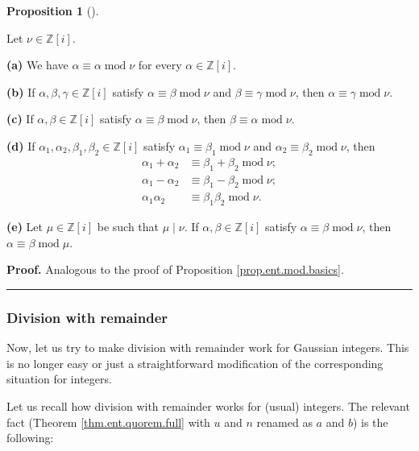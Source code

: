 \documentclass[numbers=enddot,12pt,final,onecolumn,notitlepage]{scrartcl}%
\numberwithin{exer}{subsection}
\theoremstyle{definition}
\newtheorem{prop}[theo]{Proposition}
\newenvironment{proposition}[1][]
{\begin{prop}[#1]\begin{leftbar}}
{\end{leftbar}\end{prop}}
\newenvironment{proof}[1][Proof]{\noindent\textbf{#1.} }{\ \rule{0.5em}{0.5em}}
\begin{document}
\begin{proposition}
\label{prop.Z[i].mod.basics}Let $\nu\in\mathbb{Z}\left[  i\right]  $.

\textbf{(a)} We have $\alpha\equiv\alpha\operatorname{mod}\nu$ for every
$\alpha\in\mathbb{Z}\left[  i\right]  $.

\textbf{(b)} If $\alpha,\beta,\gamma\in\mathbb{Z}\left[  i\right]  $ satisfy
$\alpha\equiv\beta\operatorname{mod}\nu$ and $\beta\equiv\gamma
\operatorname{mod}\nu$, then $\alpha\equiv\gamma\operatorname{mod}\nu$.

\textbf{(c)} If $\alpha,\beta\in\mathbb{Z}\left[  i\right]  $ satisfy
$\alpha\equiv\beta\operatorname{mod}\nu$, then $\beta\equiv\alpha
\operatorname{mod}\nu$.

\textbf{(d)} If $\alpha_{1},\alpha_{2},\beta_{1},\beta_{2}\in\mathbb{Z}\left[
i\right]  $ satisfy $\alpha_{1}\equiv\beta_{1}\operatorname{mod}\nu$ and
$\alpha_{2}\equiv\beta_{2}\operatorname{mod}\nu$, then%
\begin{align}
\alpha_{1}+\alpha_{2}  &  \equiv\beta_{1}+\beta_{2}\operatorname{mod}%
\nu;\label{eq.prop.Z[i].mod.basics.d.1}\\
\alpha_{1}-\alpha_{2}  &  \equiv\beta_{1}-\beta_{2}\operatorname{mod}%
\nu;\label{eq.prop.Z[i].mod.basics.d.2}\\
\alpha_{1}\alpha_{2}  &  \equiv\beta_{1}\beta_{2}\operatorname{mod}\nu.
\label{eq.prop.Z[i].mod.basics.d.3}%
\end{align}


\textbf{(e)} Let $\mu\in\mathbb{Z}\left[  i\right]  $ be such that $\mu\mid
\nu$. If $\alpha,\beta\in\mathbb{Z}\left[  i\right]  $ satisfy $\alpha
\equiv\beta\operatorname{mod}\nu$, then $\alpha\equiv\beta\operatorname{mod}%
\mu$.
\end{proposition}

\begin{proof}
Analogous to the proof of Proposition \ref{prop.ent.mod.basics}.
\end{proof}

\subsubsection{Division with remainder}

Now, let us try to make division with remainder work for Gaussian integers.
This is no longer easy or just a straightforward modification of the
corresponding situation for integers.

Let us recall how division with remainder works for (usual) integers. The
relevant fact (Theorem \ref{thm.ent.quorem.full} with $u$ and $n$ renamed as
$a$ and $b$) is the following:
\end{document}
